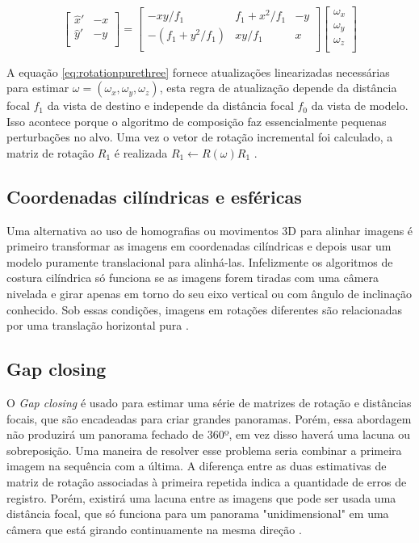 \documentclass{article}
\begin{document}
\begin{equation}\label{eq:rotationpurethree}
\begin{bmatrix}
\hat{x}' &  -x\\
\hat{y}' & -y \\
\end{bmatrix}=
\begin{bmatrix}
-xy/f_{1} & f_{1}+x^{2}/f_{1} & -y \\
-(f_{1} + y^{2}/f_{1}) & xy/f_{1} & x \\
\end{bmatrix}
\begin{bmatrix}
\omega_{x} \\
\omega_{y} \\
\omega_{z} \\
\end{bmatrix}
\end{equation}

A equação \ref{eq:rotationpurethree} fornece atualizações linearizadas necessárias para estimar $\omega=(\omega_{x}, \omega_{y}, \omega_{z})$, esta regra de atualização depende da distância focal $f_1$ da vista de destino e independe da distância focal $f_{0}$ da vista de modelo. Isso acontece porque o algoritmo de composição faz essencialmente pequenas perturbações no alvo. Uma vez o vetor de rotação incremental foi calculado, a matriz de rotação $R_{1}$ é realizada $R_{1} \leftarrow R(\omega)R_{1}$ \cite{szeliski:2010}.

\subsection{Coordenadas cilíndricas e esféricas}
Uma alternativa ao uso de homografias ou movimentos 3D para alinhar imagens é primeiro transformar as imagens em coordenadas cilíndricas e depois usar um modelo puramente translacional para alinhá-las. Infelizmente os algoritmos de costura cilíndrica só funciona se as imagens forem tiradas com uma câmera nivelada e girar apenas em torno do seu eixo vertical ou com ângulo de inclinação conhecido. Sob essas condições, imagens em rotações diferentes são relacionadas por uma translação horizontal pura \cite{szeliski:2010}.

\subsection{Gap closing}
O \textit{Gap closing} é usado para estimar uma série de matrizes de rotação e distâncias focais, que são encadeadas para criar grandes panoramas. Porém, essa abordagem não produzirá um panorama fechado de 360º, em vez disso haverá uma lacuna ou sobreposição. Uma maneira de resolver esse problema seria combinar a primeira imagem na sequência com a última. A diferença entre as duas estimativas de matriz de rotação associadas à primeira repetida indica a quantidade de erros de registro. Porém, existirá uma lacuna entre as imagens que pode ser usada uma distância focal, que só funciona para um panorama "unidimensional" em uma câmera que está girando continuamente na mesma direção \cite{szeliski:2010}.
\end{document}
